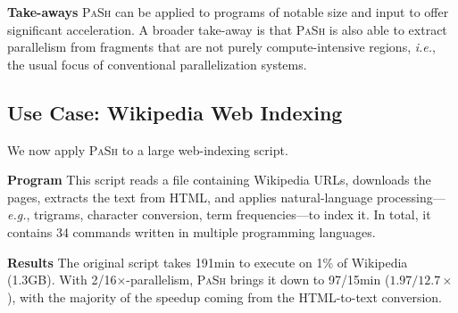 \documentclass[sigplan, review, screen, anonymous]{acmart}
\newcommand{\eg}{{\em e.g.}, }
\newcommand{\ie}{{\em i.e.}, }
\newcommand{\heading}[1]{\vspace{4pt}\noindent\textbf{#1}\enspace}
\newcommand{\ttt}[1]{\texttt{#1}}
\newcommand{\todo}[1]{\hl{#1}\xspace}
\newcommand{\nv}[1]{[{\color{cyan}nv: #1}]}
\newcommand{\kk}[1]{[{\color{magenta}kk: #1}]}
\newcommand{\sys}{{\scshape PaSh}\xspace}
\newcommand{\unix}{{\scshape Unix}\xspace}
\begin{document}


\heading{Take-aways}
\sys can be applied to programs of notable size and input
to offer significant acceleration.
A broader take-away is that \sys is also able to extract parallelism from fragments that are not purely compute-intensive regions, \ie the usual focus of conventional parallelization systems.  




% 
\subsection{Use Case: Wikipedia Web Indexing}
\label{macro2}

We now apply \sys to a large web-indexing script. %

\heading{Program}
This script reads a file containing Wikipedia URLs, downloads the pages,
extracts the text from HTML, and applies natural-language processing---\eg trigrams, character conversion, term frequencies---to index it.
In total, it contains 34 commands
written in multiple programming languages.

\heading{Results}
The original script takes 191min to execute on 1\% of Wikipedia (1.3GB).
With 2/16$\times$-parallelism, \sys brings it down to 97/15min ($1.97/12.7\times$), with the majority of the speedup coming from the HTML-to-text conversion. %
\end{document}
